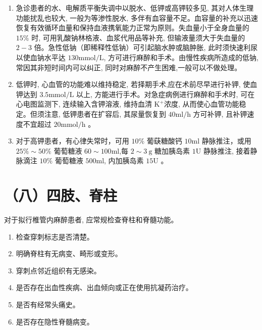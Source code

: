 \documentclass[10pt]{article}
\begin{document}
\begin{enumerate}
  \item 急诊患者的水、电解质平衡失调中以脱水、低钾或高钾较多见, 其对人体生理功能扰乱也较大, 一般为等渗性脱水, 多伴有血容量不足。血容量的补充以迅速恢复有效循环血量和保持血液携氧能力正常为原则。失血量小于全身血量的 $15 \%$ 时, 可用乳酸钠林格液、血浆代用品等补充, 但输液量须大于失血量的 $2-3$ 倍。急性低钠（即稀释性低钠）可引起脑水肿或脑肿胀, 此时须快速利尿以使血钠水平达 $130 \mathrm{mmol} / \mathrm{L}$, 方可进行麻醉和手术。由慢性疾病所造成的低钠, 常因其非短时间内可以纠正, 同时对麻醉不产生困难,一般可以不做处理。

  \item 低钾时, 心血管的功能难以维持稳定, 若择期手术,应在术前尽早进行补钾, 使血钾达到 $3.5 \mathrm{mmol} / \mathrm{L}$ 以上, 方能进行手术。对急症病例进行麻醉和手术时, 可在心电图监测下, 连续输入含钾溶液, 维持血清 $\mathrm{K}^{+}$浓度, 从而使心血管功能稳定。但须注意, 低钾患者在扩容后, 其尿量恢复到 $40 \mathrm{ml} / \mathrm{h}$ 方可补钾, 且补钾速度不宜超过 $20 \mathrm{mmol} / \mathrm{h}$ 。

  \item 对于高钾患者，有心律失常时，可用 $10 \%$ 葡蒛糖酸钙 $10 \mathrm{ml}$ 静脉推注，或用 $25 \% \sim 50 \%$ 葡萄糖液 $60 \sim 100 \mathrm{ml}$,每 $2 \sim 3 \mathrm{~g}$ 糖加胰岛素 $1 \mathrm{U}$ 静脉推注, 接着静脉滴注 $10 \%$ 葡萄糖液 $500 \mathrm{ml}$, 内加胰岛素 $15 \mathrm{U}$ 。

\end{enumerate}

\section*{（八）四肢、脊柱}
对于拟行椎管内麻醉患者, 应常规检查脊柱和脊髓功能。

\begin{enumerate}
  \item 检查穿刺标志是否清楚。

  \item 明确脊柱有无病变、畸形或变形。

  \item 穿刺点邻近组织有无感染。

  \item 是否存在出血性疾病、出血倾向或正在使用抗凝药治疗。

  \item 是否有经常头痛史。

  \item 是否存在隐性脊髓病变。

\end{enumerate}
\end{document}
